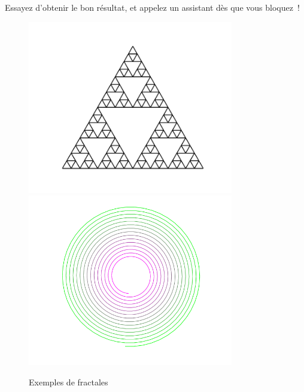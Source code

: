 \documentclass[11pt,a4paper]{article}
\begin{document}
Essayez d'obtenir le bon résultat, et appelez un assistant dès que vous
bloquez~!

\begin{figure}[H]
    \centering
    \includegraphics[width=0.8\textwidth]{img/sierpinski}
    \includegraphics[width=0.8\textwidth]{img/spiral_square}
    \caption{Exemples de fractales}
    \label{fig:fractales}
\end{figure}
\end{document}
